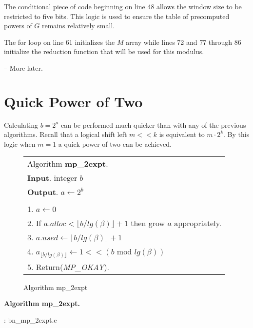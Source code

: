 \documentclass[b5paper]{book}
\begin{document}
The conditional piece of code beginning on line 48 allows the window size to be restricted to five bits.  This logic is used to ensure
the table of precomputed powers of $G$ remains relatively small.  

The for loop on line 61 initializes the $M$ array while lines 72 and 77 through 86 initialize the reduction
function that will be used for this modulus.

-- More later.

\section{Quick Power of Two}
Calculating $b = 2^a$ can be performed much quicker than with any of the previous algorithms.  Recall that a logical shift left $m << k$ is
equivalent to $m \cdot 2^k$.  By this logic when $m = 1$ a quick power of two can be achieved.

\begin{figure}[!here]
\begin{small}
\begin{center}
\begin{tabular}{l}
\hline Algorithm \textbf{mp\_2expt}. \\
\textbf{Input}.   integer $b$ \\
\textbf{Output}.  $a \leftarrow 2^b$ \\
\hline \\
1.  $a \leftarrow 0$ \\
2.  If $a.alloc < \lfloor b / lg(\beta) \rfloor + 1$ then grow $a$ appropriately. \\
3.  $a.used \leftarrow \lfloor b / lg(\beta) \rfloor + 1$ \\
4.  $a_{\lfloor b / lg(\beta) \rfloor} \leftarrow 1 << (b \mbox{ mod } lg(\beta))$ \\
5.  Return(\textit{MP\_OKAY}). \\
\hline
\end{tabular}
\end{center}
\end{small}
\caption{Algorithm mp\_2expt}
\end{figure}

\textbf{Algorithm mp\_2expt.}

\vspace{+3mm}\begin{small}
\hspace{-5.1mm}{\bf File}: bn\_mp\_2expt.c
\vspace{-3mm}
\begin{alltt}
\end{alltt}
\end{small}
\end{document}
